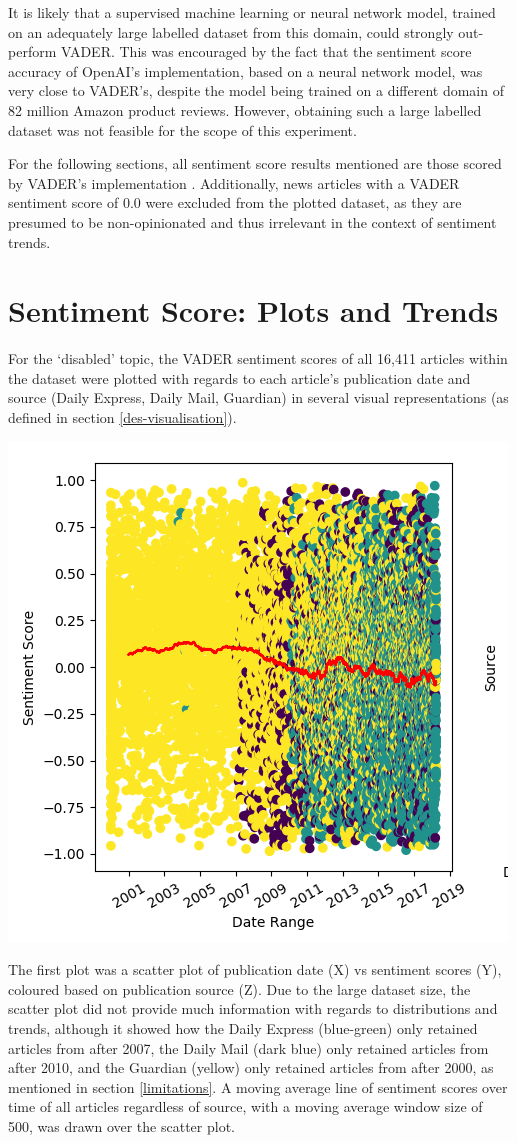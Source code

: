 \documentclass{report}
\newcommand{\textapprox}{\raisebox{0.5ex}{\texttildelow}}  %
\begin{document}
It is likely that a supervised machine learning or neural network model, trained on an adequately large labelled dataset from this domain, could strongly out-perform VADER. 
This was encouraged by the fact that the sentiment score accuracy of OpenAI's implementation, based on a neural network model, was very close to VADER's, despite the model being trained on a different domain of 82 million Amazon product reviews. 
However, obtaining such a large labelled dataset was not feasible for the scope of this experiment.

For the following sections, all sentiment score results mentioned are those scored by VADER's implementation \cite{VADER}.
Additionally, news articles with a VADER sentiment score of 0.0 were excluded from the plotted dataset, as they are presumed to be non-opinionated and thus irrelevant in the context of sentiment trends.

\section{Sentiment Score: Plots and Trends} \label{Sentiment score: plots and trends}
For the `disabled' topic, the VADER sentiment scores of all 16,411 articles within the dataset were plotted with regards to each article's publication date and source (Daily Express, Daily Mail, Guardian) in several visual representations (as defined in section \ref{des-visualisation}).

\begin{center}
	\includegraphics[height=0.5\linewidth]{row-1-col-1.png}
\end{center}

The first plot was a scatter plot of publication date (X) vs sentiment scores (Y), coloured based on publication source (Z). 
Due to the large dataset size, the scatter plot did not provide much information with regards to distributions and trends, although it showed how the Daily Express (blue-green) only retained articles from after \textapprox2007, the Daily Mail (dark blue) only retained articles from after \textapprox2010, and the Guardian (yellow) only retained articles from after \textapprox2000, as mentioned in section \ref{limitations}.
A moving average line of sentiment scores over time of all articles regardless of source, with a moving average window size of 500, was drawn over the scatter plot.
\end{document}
